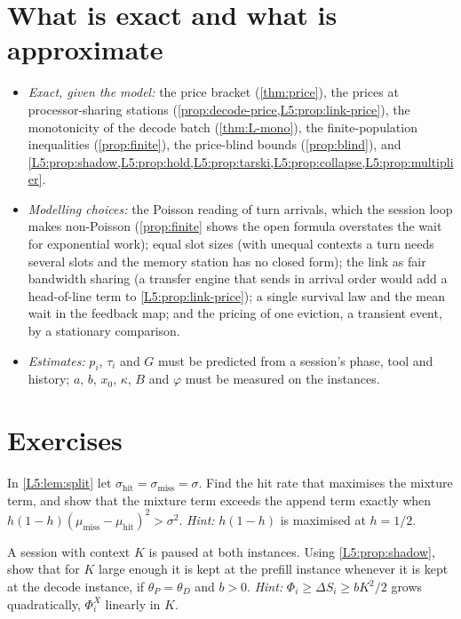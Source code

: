 \section{What is exact and what is approximate}\label{L5:sec:honest}

\begin{itemize}
\item \emph{Exact, given the model:} the price bracket (\cref{thm:price}), the prices at
  processor-sharing stations (\cref{prop:decode-price,L5:prop:link-price}), the
  monotonicity of the decode batch (\cref{thm:L-mono}), the finite-population
  inequalities (\cref{prop:finite}), the price-blind bounds (\cref{prop:blind}), and
  \cref{L5:prop:shadow,L5:prop:hold,L5:prop:tarski,L5:prop:collapse,L5:prop:multiplier}.
\item \emph{Modelling choices:} the Poisson reading of turn arrivals, which the session
  loop makes non-Poisson (\cref{prop:finite} shows the open formula overstates the wait
  for exponential work); equal slot sizes (with unequal contexts a turn needs several
  slots and the memory station has no closed form); the link as fair bandwidth sharing
  (a transfer engine that sends in arrival order would add a head-of-line term to
  \cref{L5:prop:link-price}); a single survival law and the mean wait in the feedback
  map; and the pricing of one eviction, a transient event, by a stationary comparison.
\item \emph{Estimates:} $p_i$, $\tau_i$ and $G$ must be predicted from a session's phase,
  tool and history; $a$, $b$, $x_0$, $\kappa$, $B$ and $\varphi$ must be measured on the
  instances.
\end{itemize}

\section{Exercises}

\begin{exercise}\label{L5:ex:split}
In \cref{L5:lem:split} let $\sigma_{\mathrm{hit}}=\sigma_{\mathrm{miss}}=\sigma$. Find the
hit rate that maximises the mixture term, and show that the mixture term exceeds the
append term exactly when $h(1-h)(\mu_{\mathrm{miss}}-\mu_{\mathrm{hit}})^2>\sigma^2$.
\emph{Hint:} $h(1-h)$ is maximised at $h=1/2$.
\end{exercise}

\begin{exercise}\label{L5:ex:compare}
A session with context $K$ is paused at both instances. Using \cref{L5:prop:shadow},
show that for $K$ large enough it is kept at the prefill instance whenever it is kept at
the decode instance, if $\theta_P=\theta_D$ and $b>0$.
\emph{Hint:} $\Phi_i\ge\Delta S_i\ge bK^2/2$ grows quadratically, $\Phi^X_i$ linearly in $K$.
\end{exercise}
